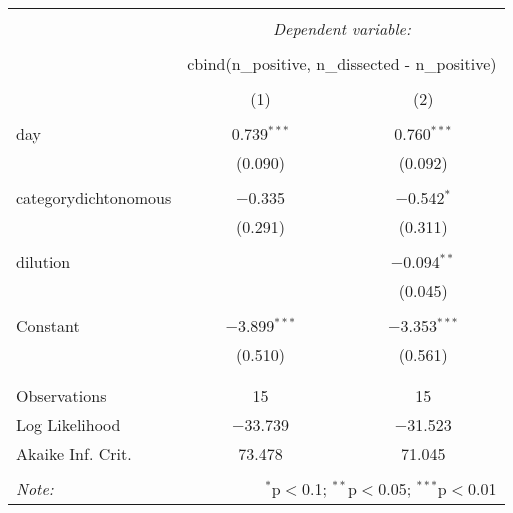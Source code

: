 
\begin{table}[!htbp] \centering 
  \caption{} 
  \label{} 
\begin{tabular}{@{\extracolsep{5pt}}lcc} 
\\[-1.8ex]\hline 
\hline \\[-1.8ex] 
 & \multicolumn{2}{c}{\textit{Dependent variable:}} \\ 
\cline{2-3} 
\\[-1.8ex] & \multicolumn{2}{c}{cbind(n\_positive, n\_dissected - n\_positive)} \\ 
\\[-1.8ex] & (1) & (2)\\ 
\hline \\[-1.8ex] 
 day & 0.739$^{***}$ & 0.760$^{***}$ \\ 
  & (0.090) & (0.092) \\ 
  & & \\ 
 categorydichtonomous & $-$0.335 & $-$0.542$^{*}$ \\ 
  & (0.291) & (0.311) \\ 
  & & \\ 
 dilution &  & $-$0.094$^{**}$ \\ 
  &  & (0.045) \\ 
  & & \\ 
 Constant & $-$3.899$^{***}$ & $-$3.353$^{***}$ \\ 
  & (0.510) & (0.561) \\ 
  & & \\ 
\hline \\[-1.8ex] 
Observations & 15 & 15 \\ 
Log Likelihood & $-$33.739 & $-$31.523 \\ 
Akaike Inf. Crit. & 73.478 & 71.045 \\ 
\hline 
\hline \\[-1.8ex] 
\textit{Note:}  & \multicolumn{2}{r}{$^{*}$p$<$0.1; $^{**}$p$<$0.05; $^{***}$p$<$0.01} \\ 
\end{tabular} 
\end{table} 
